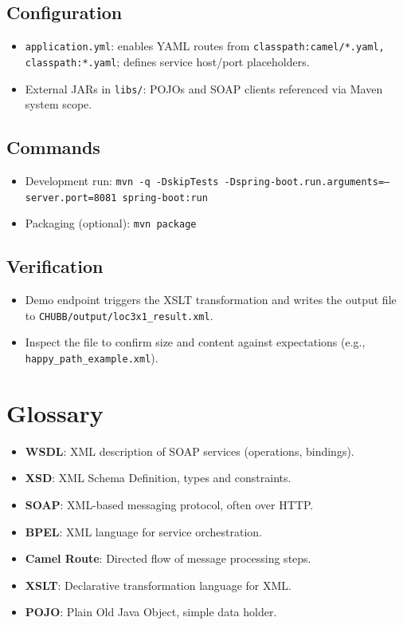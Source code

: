 \documentclass[11pt]{article}
\begin{document}
\subsection{Configuration}
\begin{itemize}
  \item \texttt{application.yml}: enables YAML routes from \texttt{classpath:camel/*.yaml, classpath:*.yaml}; defines service host/port placeholders.
  \item External JARs in \texttt{libs/}: POJOs and SOAP clients referenced via Maven system scope.
\end{itemize}

\subsection{Commands}
\begin{itemize}
  \item Development run: \texttt{mvn -q -DskipTests -Dspring-boot.run.arguments=--server.port=8081 spring-boot:run}
  \item Packaging (optional): \texttt{mvn package}
\end{itemize}

\subsection{Verification}
\begin{itemize}
  \item Demo endpoint triggers the XSLT transformation and writes the output file to \texttt{CHUBB/output/loc3x1\_result.xml}.
  \item Inspect the file to confirm size and content against expectations (e.g., \texttt{happy\_path\_example.xml}).
\end{itemize}

\section{Glossary}
\begin{itemize}
  \item \textbf{WSDL}: XML description of SOAP services (operations, bindings).
  \item \textbf{XSD}: XML Schema Definition, types and constraints.
  \item \textbf{SOAP}: XML-based messaging protocol, often over HTTP.
  \item \textbf{BPEL}: XML language for service orchestration.
  \item \textbf{Camel Route}: Directed flow of message processing steps.
  \item \textbf{XSLT}: Declarative transformation language for XML.
  \item \textbf{POJO}: Plain Old Java Object, simple data holder.
\end{itemize}
\end{document}
